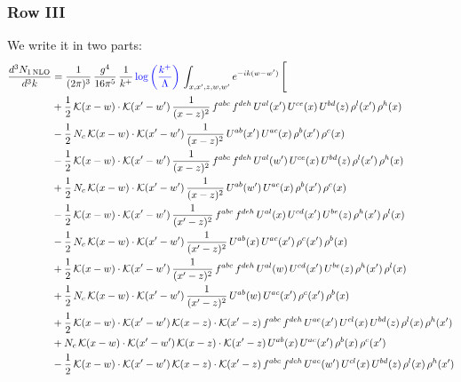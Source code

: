 \documentclass[9pt]{article}
\numberwithin{equation}{section}
\begin{document}
\subsubsection{Row III}
We write it in two parts: 
\begin{align}
\frac{d^{3}N_{1\,\mathrm{NLO}}}{d^{3}k} & = \frac{1}{(2\pi)^{3}}\,\frac{g^{4}}{16\pi^{5}}\,\frac{1}{k^{+}}\,{\color{blue}\log{\left(\frac{k^{+}}{\Lambda}\right)}}\,\int_{x,x',z,w,w'}e^{-ik(w-w')}\,\Bigg[\notag\\ &  +\frac{1}{2}\,\mathcal{K}(x-w)\cdot\mathcal{K}(x'-w')\,\frac{1}{(x-z)^{2}}\,f^{abc}\,f^{deh}\,U^{al}(x')\,U^{ce}(x)\,U^{bd}(z)\,\rho^{l}(x')\,\rho^{h}(x)\notag\\
& -\frac{1}{2}\,N_{c}\,\mathcal{K}(x-w)\cdot\mathcal{K}(x'-w')\,\frac{1}{(x-z)^{2}}\,U^{ab}(x')\,U^{ac}(x)\,\rho^{b}(x')\,\rho^{c}(x)\notag\\
& -\frac{1}{2}\,\mathcal{K}(x-w)\cdot\mathcal{K}(x'-w')\,\frac{1}{(x-z)^{2}}\,f^{abc}\,f^{deh}\,U^{al}(w')\,U^{ce}(x)\,U^{bd}(z)\,\rho^{l}(x')\,\rho^{h}(x)\notag\\
& +\frac{1}{2}\,N_{c}\,\mathcal{K}(x-w)\cdot\mathcal{K}(x'-w')\,\frac{1}{(x-z)^{2}}\,U^{ab}(w')\,U^{ac}(x)\,\rho^{b}(x')\,\rho^{c}(x)\notag\\
& -\frac{1}{2}\,\mathcal{K}(x-w)\cdot\mathcal{K}(x'-w')\,\frac{1}{(x'-z)^{2}}\,f^{abc}\,f^{deh}\,U^{al}(x)\,U^{cd}(x')\,U^{be}(z)\,\rho^{h}(x')\,\rho^{l}(x)\notag\\
& -\frac{1}{2}\,N_{c}\,\mathcal{K}(x-w)\cdot\mathcal{K}(x'-w')\,\frac{1}{(x'-z)^{2}}\,U^{ab}(x)\,U^{ac}(x')\,\rho^{c}(x')\,\rho^{b}(x)\notag\\
& +\frac{1}{2}\,\mathcal{K}(x-w)\cdot\mathcal{K}(x'-w')\,\frac{1}{(x'-z)^{2}}\,f^{abc}\,f^{deh}\,U^{al}(w)\,U^{cd}(x')\,U^{be}(z)\,\rho^{h}(x')\,\rho^{l}(x)\notag\\
& +\frac{1}{2}\,N_{c}\,\mathcal{K}(x-w)\cdot\mathcal{K}(x'-w')\,\frac{1}{(x'-z)^{2}}\,U^{ab}(w)\,U^{ac}(x')\,\rho^{c}(x')\,\rho^{b}(x)\notag\\
& +\frac{1}{2}\,\mathcal{K}(x-w)\cdot\mathcal{K}(x'-w')\,\mathcal{K}(x-z)\cdot\mathcal{K}(x'-z)\,f^{abc}\,f^{deh}\,U^{ae}(x')\,U^{cl}(x)\,U^{bd}(z)\,\rho^{l}(x)\,\rho^{h}(x')\notag\\
& +N_{c}\,\mathcal{K}(x-w)\cdot\mathcal{K}(x'-w')\,\mathcal{K}(x-z)\cdot\mathcal{K}(x'-z)\,U^{ab}(x)\,U^{ac}(x')\,\rho^{b}(x)\,\rho^{c}(x')\notag\\
& -\frac{1}{2}\,\mathcal{K}(x-w)\cdot\mathcal{K}(x'-w')\,\mathcal{K}(x-z)\cdot\mathcal{K}(x'-z)\,f^{abc}\,f^{deh}\,U^{ae}(w')\,U^{cl}(x)\,U^{bd}(z)\,\rho^{l}(x)\,\rho^{h}(x')\notag\\

\end{align}
\end{document}
